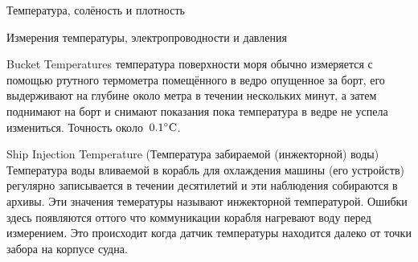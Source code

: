 \begin{chapter}{Температура, солёность и плотность}
\begin{section}{Измерения температуры, электропроводности и давления}
\begin{paragraph}{Bucket Temperatures}
температура поверхности моря обычно измеряется с помощью ртутного
термометра помещённого в ведро опущенное за борт, его выдерживают на
глубине около метра в течении нескольких минут, а затем поднимают на
борт и снимают показания пока температура в ведре не успела
измениться. Точность около~${0.1}^\circ\mbox{C}$.
%
\end{paragraph}

\begin{paragraph}{Ship Injection Temperature (Температура забираемой (инжекторной) воды)}
Температура воды вливаемой в корабль для охлаждения машины (его
устройств) регулярно записывается в течении десятилетий и эти
наблюдения собираются в архивы. Эти значения темературы называют
инжекторной температурой. Ошибки здесь появляются оттого что
коммуникации корабля нагревают воду перед измерением. Это происходит
когда датчик температуры находится далеко от точки забора на корпусе
судна.
%
\end{paragraph}


\end{section}
\end{chapter}
